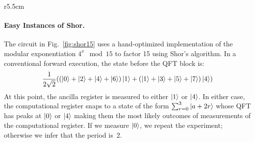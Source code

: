 \documentclass{article}
\begin{document}
\begin{refsection}
\begin{wrapfigure}{r}{5.5cm}
\begin{center}
\end{center}
\caption{\label{fig:shor15}Finding the period of $4^x \mod{15}$}
\end{wrapfigure}
\paragraph*{Easy Instances of Shor.}
The circuit in Fig.~\ref{fig:shor15} uses a hand-optimized
implementation of the modular exponentiation $4^x \mod{15}$ to factor
15 using Shor's algorithm. In a conventional forward execution, the
state before the QFT block is:
\[
\frac{1}{2\sqrt{2}} (
  (\ket{0} + \ket{2} + \ket{4} + \ket{6}) \ket{1} + 
  (\ket{1} + \ket{3} + \ket{5} + \ket{7}) \ket{4}
  )
\]
At this point, the ancilla register is measured to either $\ket{1}$ or
$\ket{4}$. In either case, the computational register snaps to a state
of the form $\sum_{r=0}^3 \ket{a+2r}$ whose QFT has peaks at $\ket{0}$
or $\ket{4}$ making them the most likely outcomes of measurements of
the computational register. If we measure $\ket{0}$, we repeat the
experiment; otherwise we infer that the period is~2.


\end{refsection}
\end{document}

